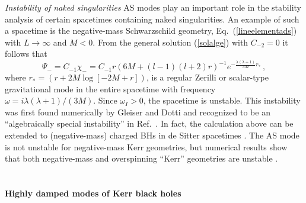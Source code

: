 \documentclass[]{iopart}
\def\be{\begin{equation}}
\def\ee{\end{equation}}
\begin{document}
\noindent
{\it Instability of naked singularities}
AS modes play an important role in the stability analysis of certain
spacetimes containing naked singularities.  An example of such a spacetime is
the negative-mass Schwarzschild geometry, Eq.~(\ref{lineelementads}) with
$L\to \infty$ and $M<0$.
%
From the general solution (\ref{solalge}) with $C_{-2}=0$ it follows that
%
\be
\Psi_{-}=C_{-1}\chi_{-}=C_{-1}r\left (6M+(l-1)(l+2)r\right )^{-1}e^{-\frac{\lambda(\lambda+1)}{3M}r_*}\,,
\ee
%
where $r_*=(r+2M\log[-2 M + r])$, is a regular Zerilli or scalar-type
gravitational mode in the entire spacetime with frequency
$\omega=i\lambda(\lambda+1)/(3M)$. Since $\omega_I>0$, the spacetime is
unstable.  This instability was first found numerically by Gleiser and Dotti
\cite{Gleiser:2006yz} and recognized to be an ``algebraically special
instability'' in Ref.~\cite{Cardoso:2006bv}. In fact, the calculation above
can be extended to (negative-mass) charged BHs in de Sitter spacetimes
\cite{Cardoso:2006bv}. The AS mode is not unstable for negative-mass Kerr
geometries, but numerical results show that both negative-mass and
overspinning ``Kerr'' geometries are unstable
\cite{Dotti:2006gc,Dotti:2008yr,Cardoso:2008kj,Pani:2009fd}.

\clearpage
\section{\label{app:highdampinglimitKerr}}
{\bf Highly damped modes of Kerr black holes}
\vskip 2mm
\end{document}
